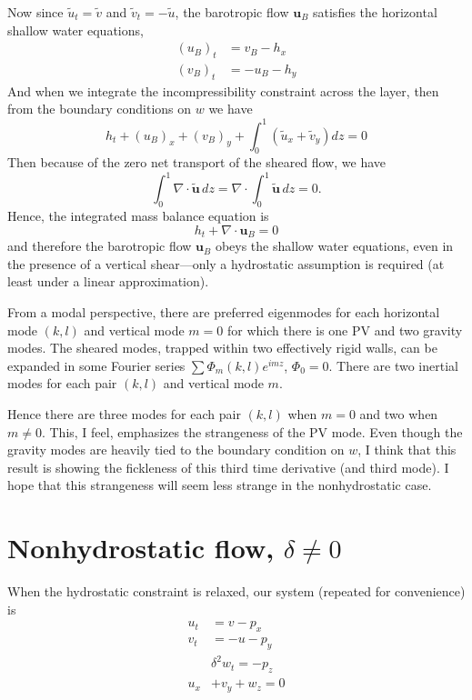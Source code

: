 \documentclass[letterpaper, 11pt]{article}
\begin{document}
Now since $\tilde{u}_t = \tilde{v}$ and $\tilde{v}_t = -\tilde{u}$, the barotropic flow $\mathbf{u}_B$ satisfies the horizontal shallow water equations,
\begin{subequations}
\begin{align}
(u_B)_t &= v_B - h_x \\
(v_B)_t &= -u_B - h_y
\end{align}
\end{subequations}
And when we integrate the incompressibility constraint across the layer, then from the boundary conditions on $w$ we have
\begin{equation}
h_t + (u_B)_x + (v_B)_y + \int_0^1 \left(\tilde{u}_x + \tilde{v}_y\right) dz = 0
\end{equation}
Then because of the zero net transport of the sheared flow, we have
\begin{equation}
\int_0^1 \nabla \cdot \mathbf{\tilde{u}} \, dz = \nabla \cdot \int_0^1 \mathbf{\tilde{u}} \, dz = 0.
\end{equation}
Hence, the integrated mass balance equation is
\begin{equation}
h_t + \nabla \cdot \mathbf{u}_B = 0
\end{equation}
and therefore the barotropic flow $\mathbf{u}_B$ obeys the shallow water equations, even in the presence of a vertical shear---only a hydrostatic assumption is required (at least under a linear approximation).

From a modal perspective, there are preferred eigenmodes for each horizontal mode $(k,l)$ and vertical mode $m=0$ for which there is one PV and two gravity modes. The sheared modes, trapped within two effectively rigid walls, can be expanded in some Fourier series $\sum \Phi_m(k,l) e^{imz}$, $\Phi_0 = 0$. There are two inertial modes for each pair $(k,l)$ and vertical mode $m$.

Hence there are three modes for each pair $(k,l)$ when $m = 0$ and two when $m \neq 0$. This, I feel, emphasizes the strangeness of the PV mode. Even though the gravity modes are heavily tied to the boundary condition on $w$, I think that this result is showing the fickleness of this third time derivative (and third mode). I hope that this strangeness will seem less strange in the nonhydrostatic case.

\section{Nonhydrostatic flow, $\delta \neq 0$}

When the hydrostatic constraint is relaxed, our system (repeated for convenience) is
\begin{subequations}
\begin{align}
u_t &= v - p_x \\
v_t &= -u - p_y \\
&\delta^2 w_t = -p_z \\
u_x &+ v_y + w_z = 0
\end{align}
\end{subequations}
\end{document}
